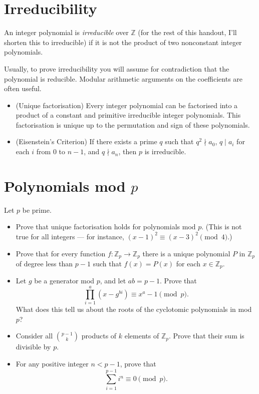 \documentclass{article}
\newcommand\Zz{\mathbb{Z}}
\begin{document}
\section{Irreducibility}
An integer polynomial is \emph{irreducible} over $\mathbb Z$ (for the rest of
this handout, I'll shorten this to irreducible) if it is not the product of two
nonconstant integer polynomials.

Usually, to prove irreducibility you will assume for contradiction that the
polynomial is reducible. Modular arithmetic arguments on the coefficients are
often useful.
\begin{itemize}
  \item (Unique factorisation) Every integer polynomial can be factorised into a
    product of a constant and primitive irreducible integer
    polynomials. This factorisation is unique up to the permutation and sign of
    these polynomials.
  \item (Eisenstein's Criterion) If there exists a prime $q$ such that $q^2\nmid
    a_0$, $q\mid a_i$ for each $i$ from $0$ to $n-1$, and $q\nmid a_n$, then $p$
    is irreducible.
\end{itemize}
\section{Polynomials mod $p$}
Let $p$ be prime.
\begin{itemize}
  \item Prove that unique factorisation holds for polynomials mod $p$. (This is
    not true for all integers --- for instance,
    $(x-1)^2\equiv(x-3)^2\pmod 4$.)
  \item Prove that for every function $f:\Zz_p\to\Zz_p$ there is a unique polynomial $P$ in
    $\Zz_p$ of degree less than $p-1$ such that $f(x)=P(x)$ for each
    $x\in\Zz_p$.
  \item Let $g$ be a generator mod $p$, and let $ab=p-1$. Prove that
    \[\prod_{i=1}^a (x-g^{bi})\equiv x^a-1\pmod p.\]
    What does this tell us about the roots of the cyclotomic polynomials in mod
    $p$?
  \item Consider all $\binom{p-1}k$ products of $k$ elements of $\Zz_p$. Prove
    that their sum is divisible by $p$.
  \item For any positive integer $n<p-1$, prove that
    \[\sum_{i=1}^{p-1} i^n\equiv 0\pmod p.\]
\end{itemize}
\end{document}
